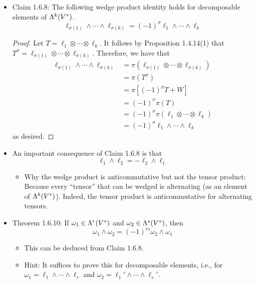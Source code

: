 \documentclass[../notes.tex]{subfiles}
\begin{document}
\begin{itemize}
    \item Claim 1.6.8: The following wedge product identity holds for decomposable elements of $\lam[k]{V^*}$.
    \begin{equation*}
        \ell_{\sigma(1)}\wedge\cdots\wedge\ell_{\sigma(k)} = (-1)^\sigma\ell_1\wedge\cdots\wedge\ell_k
    \end{equation*}
    \begin{proof}
        Let $T=\ell_1\otimes\cdots\otimes\ell_k$. It follows by Proposition 1.4.14(1) that $T^\sigma=\ell_{\sigma(1)}\otimes\cdots\otimes\ell_{\sigma(k)}$. Therefore, we have that
        \begin{align*}
            \ell_{\sigma(1)}\wedge\cdots\wedge\ell_{\sigma(k)} &= \pi(\ell_{\sigma(1)}\otimes\cdots\otimes\ell_{\sigma(k)})\\
            &= \pi(T^\sigma)\\
            &= \pi[(-1)^\sigma T+W]\\
            &= (-1)^\sigma\pi(T)\\
            &= (-1)^\sigma\pi(\ell_1\otimes\cdots\otimes\ell_k)\\
            &= (-1)^\sigma\ell_1\wedge\cdots\wedge\ell_k
        \end{align*}
        as desired.
    \end{proof}
    \item An important consequence of Claim 1.6.8 is that
    \begin{equation*}
        \ell_1\wedge\ell_2 = -\ell_2\wedge\ell_1
    \end{equation*}
    \begin{itemize}
        \item Why the wedge product is anticommutative but not the tensor product: Because every “tensor” that can be wedged is alternating (as an element of $\lam[k]{V^*}$). Indeed, the tensor product is anticommutative for alternating tensors.
    \end{itemize}
    \item Theorem 1.6.10: If $\omega_1\in\lam[r]{V^*}$ and $\omega_2\in\lam[s]{V^*}$, then
    \begin{equation*}
        \omega_1\wedge\omega_2 = (-1)^{rs}\omega_2\wedge\omega_1
    \end{equation*}
    \begin{itemize}
        \item This can be deduced from Claim 1.6.8.
        \item Hint: It suffices to prove this for decomposable elements, i.e., for $\omega_1=\ell_1\wedge\cdots\wedge\ell_r$ and $\omega_2=\ell_1'\wedge\cdots\wedge\ell_s'$.

\end{itemize}
\end{itemize}
\end{document}
